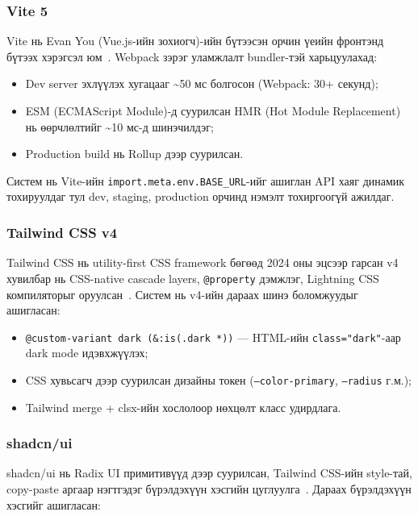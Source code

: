 \documentclass[12pt,a4paper]{article}
\begin{document}
\subsubsection{Vite 5}

Vite нь Evan You (Vue.js-ийн зохиогч)-ийн бүтээсэн орчин үеийн
фронтэнд бүтээх хэрэгсэл юм~\cite{vite2024}. Webpack зэрэг
уламжлалт bundler-тэй харьцуулахад:

\begin{itemize}
  \item Dev server эхлүүлэх хугацааг \textasciitilde{}50 мс болгосон
        (Webpack: 30+ секунд);
  \item ESM (ECMAScript Module)-д суурилсан HMR (Hot Module
        Replacement) нь өөрчлөлтийг \textasciitilde{}10 мс-д
        шинэчилдэг;
  \item Production build нь Rollup дээр суурилсан.
\end{itemize}

Систем нь Vite-ийн \texttt{import.meta.env.BASE\_URL}-ийг ашиглан
API хаяг динамик тохируулдаг тул dev, staging, production орчинд
нэмэлт тохиргоогүй ажилдаг.

\subsubsection{Tailwind CSS v4}

Tailwind CSS нь utility-first CSS framework бөгөөд 2024 оны эцсээр
гарсан v4 хувилбар нь CSS-native cascade layers, \texttt{@property}
дэмжлэг, Lightning CSS компиляторыг оруулсан~\cite{tailwind2024}.
Систем нь v4-ийн дараах шинэ боломжуудыг ашигласан:

\begin{itemize}
  \item \texttt{@custom-variant dark (\&:is(.dark *))} --- HTML-ийн
        \texttt{class="dark"}-аар dark mode идэвхжүүлэх;
  \item CSS хувьсагч дээр суурилсан дизайны токен
        (\texttt{--color-primary}, \texttt{--radius} г.м.);
  \item Tailwind merge + clsx-ийн хослолоор нөхцөлт класс удирдлага.
\end{itemize}

\subsubsection{shadcn/ui}

shadcn/ui нь Radix UI примитивүүд дээр суурилсан, Tailwind CSS-ийн
style-тай, copy-paste аргаар нэгтгэдэг бүрэлдэхүүн хэсгийн
цуглуулга~\cite{shadcnui2024}. Дараах бүрэлдэхүүн хэсгийг ашигласан:
\end{document}
